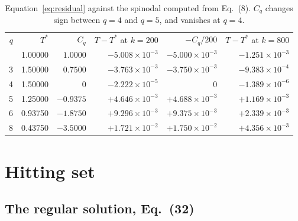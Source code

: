 \documentclass[aps,pre,onecolumn,superscriptaddress,floatfix,nofootinbib]{revtex4-2}
\begin{document}
\begin{table}[t]
\caption{\label{tab:resid}Equation~\eqref{eq:residual} against the spinodal
computed from Eq.~(8). $C_q$ changes sign between $q=4$ and $q=5$, and vanishes
at $q=4$.}
\begin{ruledtabular}
\begin{tabular}{rrrrrr}
$q$ & $T^{\ast}$ & $C_q$ & $T-T^{\ast}$ at $k=200$ & $-C_q/200$ & $T-T^{\ast}$ at $k=800$ \\
\colrule
2 & 1.00000 & $ 1.0000$ & $-5.008\times10^{-3}$ & $-5.000\times10^{-3}$ & $-1.251\times10^{-3}$ \\
3 & 1.50000 & $ 0.7500$ & $-3.763\times10^{-3}$ & $-3.750\times10^{-3}$ & $-9.383\times10^{-4}$ \\
4 & 1.50000 & $ 0$      & $-2.222\times10^{-5}$ & $0$                   & $-1.389\times10^{-6}$ \\
5 & 1.25000 & $-0.9375$ & $+4.646\times10^{-3}$ & $+4.688\times10^{-3}$ & $+1.169\times10^{-3}$ \\
6 & 0.93750 & $-1.8750$ & $+9.296\times10^{-3}$ & $+9.375\times10^{-3}$ & $+2.339\times10^{-3}$ \\
8 & 0.43750 & $-3.5000$ & $+1.721\times10^{-2}$ & $+1.750\times10^{-2}$ & $+4.356\times10^{-3}$ \\
\end{tabular}
\end{ruledtabular}
\end{table}

\section{Hitting set}
\label{sec:hs}

\subsection{The regular solution, Eq.~(32)}
\end{document}
